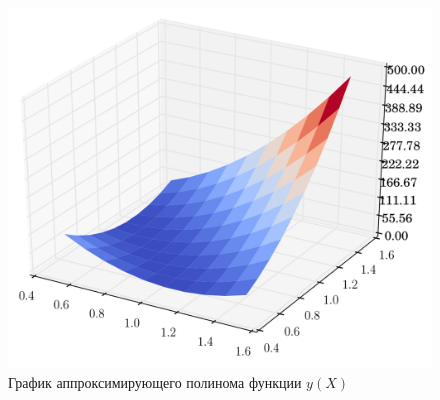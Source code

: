 \begin{figure}[h!]
  \centering
  \includegraphics[width=0.65\linewidth]{pic/taylor_2}
  \caption{График аппроксимирующего полинома функции $y(X)$}
  \label{pic:taylor}
\end{figure}
